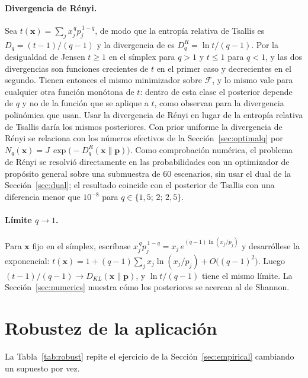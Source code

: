 \documentclass[11pt]{article}
\newcommand{\p}{\mathbf{p}}
\newcommand{\x}{\mathbf{x}}
\begin{document}
\paragraph{Divergencia de R\'enyi.} Sea
$t(\x) = \sum_j x_j^{\,q} p_j^{\,1-q}$, de modo que la entrop\'ia relativa de
Tsallis es $D_q = (t-1)/(q-1)$ y la divergencia de \citet{Renyi1961} es
$D^R_q = \ln t/(q-1)$. Por la desigualdad de Jensen $t \ge 1$ en el s\'implex
para $q>1$ y $t \le 1$ para $q<1$, y las dos divergencias son funciones
crecientes de $t$ en el primer caso y decrecientes en el segundo. Tienen
entonces el mismo minimizador sobre $\mathcal{F}$, y lo mismo vale para
cualquier otra funci\'on mon\'otona de $t$: dentro de esta clase el posterior
depende de $q$ y no de la funci\'on que se aplique a $t$, como observan
\citet{DeyJuneja2012} para la divergencia polin\'omica que usan. Usar la divergencia
de R\'enyi en lugar de la entrop\'ia relativa de Tsallis dar\'ia los mismos
posteriores. Con prior uniforme la divergencia de R\'enyi se relaciona con los n\'umeros
efectivos de la Secci\'on~\ref{sec:optimalq} por
$N_q(\x) = J\,\exp\!\big(-D^R_q(\x\|\p)\big)$. Como comprobaci\'on num\'erica,
el problema de R\'enyi se resolvi\'o directamente en las probabilidades con un
optimizador de prop\'osito general sobre una submuestra de 60 escenarios,
sin usar el dual de la Secci\'on~\ref{sec:dual}; el resultado coincide con
el posterior de Tsallis con una diferencia menor que $10^{-8}$ para
$q \in \{1{,}5;\, 2;\, 2{,}5\}$.

\paragraph{L\'imite $q \to 1$.} Para $\x$ fijo en el s\'implex, escr\'ibase
$x_j^{\,q} p_j^{\,1-q} = x_j\, e^{(q-1)\ln(x_j/p_j)}$ y desarr\'ollese la
exponencial:
$t(\x) = 1 + (q-1)\sum_j x_j \ln(x_j/p_j) + O\big((q-1)^2\big)$. Luego
$(t-1)/(q-1) \to D_{KL}(\x\|\p)$, y $\ln t/(q-1)$ tiene el mismo l\'imite.
La Secci\'on~\ref{sec:numerics} muestra c\'omo los posteriores se acercan al
de Shannon.

\section{Robustez de la aplicaci\'on}\label{app:robust}

La Tabla~\ref{tab:robust} repite el ejercicio de la
Secci\'on~\ref{sec:empirical} cambiando un supuesto por vez.
\end{document}
